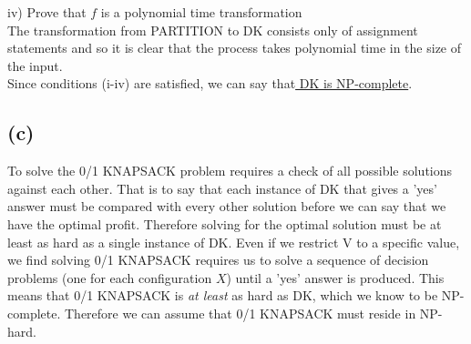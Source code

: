 			\noindent
	    iv) Prove that $f$ is a polynomial time transformation\\
			\indent The transformation from PARTITION to DK consists only of assignment statements and so it is clear \indent that the process takes polynomial time in the size of the input. \\
			
			\noindent
			Since conditions (i-iv) are satisfied, we can say that\underline{ DK is NP-complete}.
			
	\subsection*{(c)}
		To solve the 0/1 KNAPSACK problem requires a check of all possible solutions against each other. 
		That is to say that each instance of DK that gives a 'yes' answer must be compared with every other solution before we can say that we have the optimal profit. Therefore solving for the optimal solution must be at least as hard as a single instance of DK. 
		Even if we restrict V to a specific value, we find solving 0/1 KNAPSACK requires us to solve a sequence of decision problems (one for each configuration $X$) until a 'yes' answer is produced. 
		This means that 0/1 KNAPSACK is \textit{at least} as hard as DK, which we know to be NP-complete.
		Therefore we can assume that 0/1 KNAPSACK  must reside in NP-hard. 